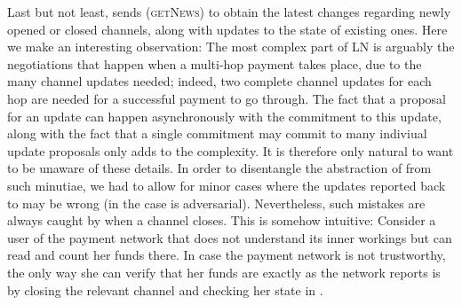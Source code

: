   Last but not least, \environment{} sends (\textsc{getNews}) to obtain the
  latest changes regarding newly opened or closed channels, along with updates
  to the state of existing ones. Here we make an interesting observation: The
  most complex part of LN is arguably the negotiations that happen when a
  multi-hop payment takes place, due to the many channel updates needed; indeed,
  two complete channel updates for each hop are needed for a successful payment
  to go through. The fact that a proposal for an update can happen
  asynchronously with the commitment to this update, along with the fact that a
  single commitment may commit to many indiviual update proposals only adds to
  the complexity. It is therefore only natural to want \fpaynet{} to be unaware
  of these details. In order to disentangle the abstraction of \fpaynet{} from
  such minutiae, we had to allow for minor cases where the updates reported back
  to \environment{} may be wrong (in the case \simulator{} is adversarial).
  Nevertheless, such mistakes are always caught by \fpaynet{} when a channel
  closes.  This is somehow intuitive: Consider
  a user of the payment network that does not understand its inner workings but
  can read \ledger{} and count her funds there. In case the payment network is
  not trustworthy, the only way she can verify that her funds are exactly as the
  network reports is by closing the relevant channel and checking her state in
  \ledger.
